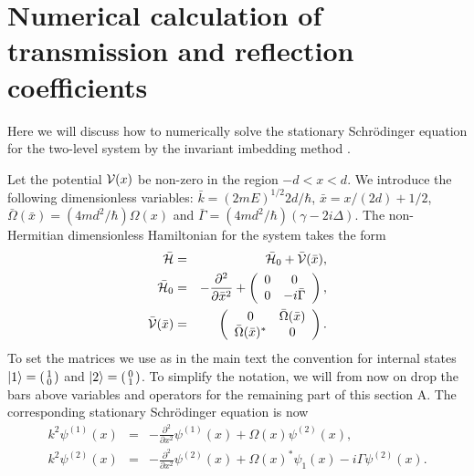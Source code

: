 
\chapter{Numerical calculation of transmission and reflection coefficients}
\label{Appendix:NumericalCalculationOfTandR}

%

Here we will discuss how to numerically solve  the
stationary Schr\"odinger equation for the two-level system
by the invariant imbedding method \cite{Singer1982,Band1994}.
%

%
Let the potential ${\cal V}(x)$ be non-zero in the region $-d < x < d$.
We  introduce the following dimensionless variables: $\bar k = (2mE)^{1/2}2d/\hbar$, $\bar x = x/(2d) + 1/2$,
$\bar\Omega (\bar x)= (4md^2/\hbar) \Omega(x)$ and $\bar\Gamma = (4md^2/\hbar) (\gamma-2i\Delta)$.
%
%
The non-Hermitian dimensionless Hamiltonian for the system takes the form
%
\begin{eqnarray}
	\bar {\cal H}&=& \bar {\cal H}_{0}+\bar {\cal V}(\bar x), \\
	\bar {\cal H}_{0}&=&- \frac{\partial^2 }{\partial {\bar x}^2}+\left(\begin{array}{cc}
	0 & 0 \\
	0 & -i\bar\Gamma
	\end{array}\right), \\
	\bar {\cal V}(\bar x)&=& \left(\begin{array}{cc}
	0 & \bar\Omega (\bar x)\\
	\bar\Omega (\bar x)^{*} & 0
	\end{array}\right).
\end{eqnarray}
%
To set the matrices we use as in the main text the convention for internal states $\ket{1} = \left(\begin{smallmatrix}1\\0\end{smallmatrix}\right)$ and $\ket{2} = \left(\begin{smallmatrix}0\\1\end{smallmatrix}\right)$.
%
To simplify the notation, we will from now on drop the bars above variables and operators for the remaining part of this section A.
The corresponding stationary Schr\"odinger equation is now
%
\begin{eqnarray}
	k^{2} \psi^{(1)}(x)&=&-\frac{\partial^2}{\partial x^2}\psi^{(1)}(x)+\Omega(x) \psi^{(2)}(x),
	\nonumber \\
	k^{2} \psi^{(2)}(x)&=&-\frac{\partial^2}{\partial x^2}\psi^{(2)}(x)+\Omega(x)^* \psi_{1}(x)-i \Gamma \psi^{(2)}(x).
	\nonumber
\end{eqnarray}
